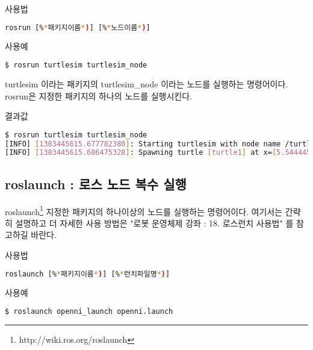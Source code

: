 \setcounter{num}{0}

\vspace{\baselineskip}
\noindent
{}\circled{\thenum} 사용법
\begin{lstlisting}[language=bash]
rosrun [%*패키지이름*)] [%*노드이름*)]
\end{lstlisting}

\noindent
{}\circled{\thenum} 사용예
\begin{lstlisting}[language=bash]
$ rosrun turtlesim turtlesim_node 
\end{lstlisting}

\noindent
turtlesim 이라는 패키지의 turtlesim\_node 이라는 노드를 실행하는 명령어이다. rosrun은 지정한 패키지의 하나의 노드를 실행시킨다. 

\vspace{\baselineskip}
\noindent
{}\circled{\thenum} 결과값
\begin{lstlisting}[language=bash]
$ rosrun turtlesim turtlesim_node 
[INFO] [1383445615.677782380]: Starting turtlesim with node name /turtlesim
[INFO] [1383445615.686475328]: Spawning turtle [turtle1] at x=[5.544445], y=[5.544445], theta=[0.000000]
\end{lstlisting}

\subsection{roslaunch : 로스 노드 복수 실행}

roslaunch\footnote{http://wiki.ros.org/roslaunch} 지정한 패키지의 하나이상의 노드를 실행하는 명령어이다. 여기서는 간략히 설명하고 더 자세한 사용 방법은 "로봇 운영체제 강좌 : 18. 로스런치 사용법" 를 참고하길 바란다.

\setcounter{num}{0}

\vspace{\baselineskip}
\noindent
{}\circled{\thenum} 사용법
\begin{lstlisting}[language=bash]
roslaunch [%*패키지이름*)] [%*런치파일명*)]
\end{lstlisting}

\noindent
{}\circled{\thenum} 사용예
\begin{lstlisting}[language=bash]
$ roslaunch openni_launch openni.launch 
\end{lstlisting}

